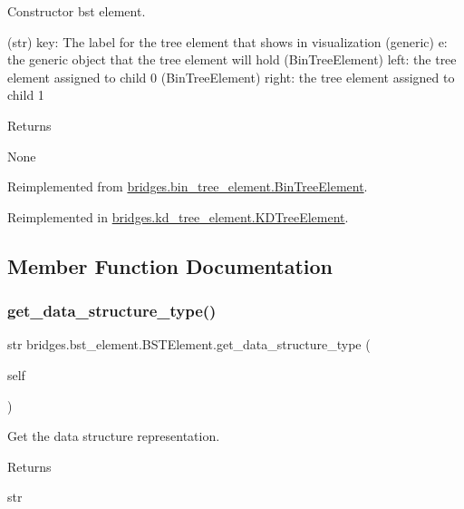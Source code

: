 Constructor bst element. 

\begin{DoxyVerb}       (str) key: The label for the tree element that shows in visualization
       (generic) e: the generic object that the tree element will hold
       (BinTreeElement) left: the tree element assigned to child 0
       (BinTreeElement) right: the tree element assigned to child 1
\end{DoxyVerb}
 \begin{DoxyReturn}{Returns}


None 
\end{DoxyReturn}


Reimplemented from \mbox{\hyperlink{classbridges_1_1bin__tree__element_1_1_bin_tree_element_a4c50812c9a43aa5cd75ccc46b818a8b2}{bridges.\+bin\+\_\+tree\+\_\+element.\+Bin\+Tree\+Element}}.



Reimplemented in \mbox{\hyperlink{classbridges_1_1kd__tree__element_1_1_k_d_tree_element_ad48f0bdabbb21cf83782efc1f8dbc1ed}{bridges.\+kd\+\_\+tree\+\_\+element.\+K\+D\+Tree\+Element}}.



\subsection{Member Function Documentation}
\mbox{\label{classbridges_1_1bst__element_1_1_b_s_t_element_a8e655e06ba0f77b7e2681b6d291f39de}} 
\subsubsection{\texorpdfstring{get\_data\_structure\_type()}{get\_data\_structure\_type()}}
{\footnotesize\ttfamily  str bridges.\+bst\+\_\+element.\+B\+S\+T\+Element.\+get\+\_\+data\+\_\+structure\+\_\+type (\begin{DoxyParamCaption}\item[{}]{self }\end{DoxyParamCaption})}



Get the data structure representation. 

\begin{DoxyReturn}{Returns}


str 
\end{DoxyReturn}



